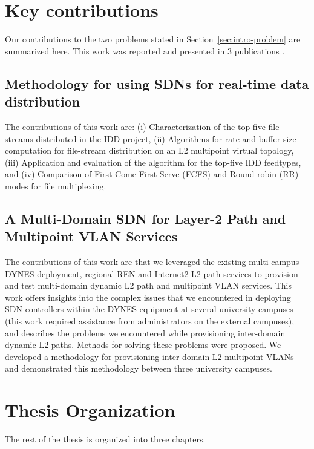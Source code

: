 \section{Key contributions}
\label{sec:intro-contributions}

Our contributions to the two problems stated in Section~\ref{sec:intro-problem} are summarized here. This work was reported and presented in 3 publications \cite{ji2015file, tepsuporn2015multi, chen2016file}. 

\subsection{Methodology for using SDNs for real-time data distribution}
The contributions of this work are: (i) Characterization of the top-five file-streams distributed in the IDD project, (ii) Algorithms for rate and buffer size computation for
file-stream distribution on an L2 multipoint virtual topology, (iii) Application and evaluation of the algorithm for the top-five IDD feedtypes, and (iv) Comparison of First Come First Serve (FCFS) and Round-robin (RR) modes for file multiplexing.



\subsection{A Multi-Domain SDN for Layer-2 Path and Multipoint VLAN Services}

The contributions of this work are that we leveraged the existing multi-campus DYNES deployment,
regional REN and Internet2 L2 path services to provision and test multi-domain dynamic L2 path and multipoint VLAN
services. This work offers insights into the complex issues that we encountered in deploying SDN controllers
within the DYNES equipment at several university campuses (this work required assistance from administrators
on the external campuses), and describes the problems we encountered while provisioning inter-domain dynamic L2 paths. Methods for solving these problems were proposed. We developed a methodology for provisioning
inter-domain L2 multipoint VLANs and demonstrated this methodology between three university campuses.



\section{Thesis Organization}
The rest of the thesis is organized into three chapters.

